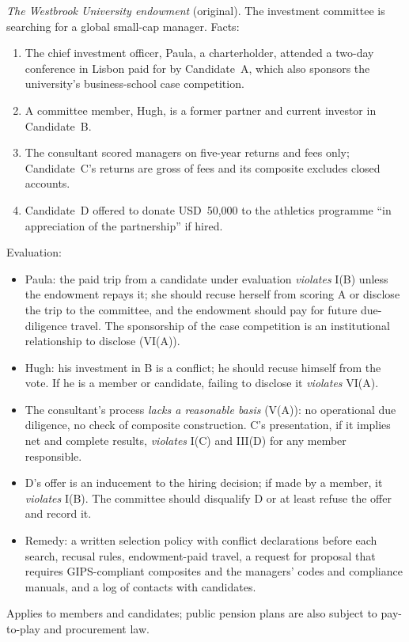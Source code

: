\begin{qfmethod}
 \emph{The Westbrook University endowment} (original). The investment committee is searching for a global small-cap manager. Facts:
\begin{enumerate}
\item The chief investment officer, Paula, a charterholder, attended a two-day conference in Lisbon paid for by Candidate~A, which also sponsors the university's business-school case competition.
\item A committee member, Hugh, is a former partner and current investor in Candidate~B.
\item The consultant scored managers on five-year returns and fees only; Candidate~C's returns are gross of fees and its composite excludes closed accounts.
\item Candidate~D offered to donate USD~50,000 to the athletics programme ``in appreciation of the partnership'' if hired.
\end{enumerate}
Evaluation:
\begin{itemize}
\item Paula: the paid trip from a candidate under evaluation \emph{violates} I(B) unless the endowment repays it; she should recuse herself from scoring A or disclose the trip to the committee, and the endowment should pay for future due-diligence travel. The sponsorship of the case competition is an institutional relationship to disclose (VI(A)).
\item Hugh: his investment in B is a conflict; he should recuse himself from the vote. If he is a member or candidate, failing to disclose it \emph{violates} VI(A).
\item The consultant's process \emph{lacks a reasonable basis} (V(A)): no operational due diligence, no check of composite construction. C's presentation, if it implies net and complete results, \emph{violates} I(C) and III(D) for any member responsible.
\item D's offer is an inducement to the hiring decision; if made by a member, it \emph{violates} I(B). The committee should disqualify D or at least refuse the offer and record it.
\item Remedy: a written selection policy with conflict declarations before each search, recusal rules, endowment-paid travel, a request for proposal that requires GIPS-compliant composites and the managers' codes and compliance manuals, and a log of contacts with candidates.
\end{itemize}

 Applies to members and candidates; public pension plans are also subject to pay-to-play and procurement law.


\end{qfmethod}
